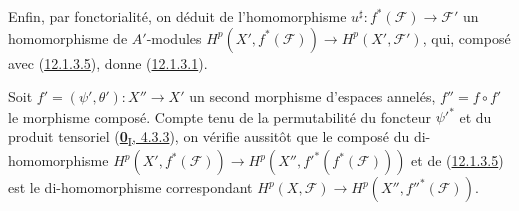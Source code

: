 \begin{env}[12.1.3]
Enfin, par fonctorialité, on déduit de l'homomorphisme
$u^\sharp:f^*(\mathcal F)\to\mathcal F'$ un homomorphisme de $A'$-modules
$H^p(X',f^*(\mathcal F))\to H^p(X',\mathcal F')$, qui, composé avec
(\hyperref[0.12.1.3.5-fr]{12.1.3.5}), donne
(\hyperref[0.12.1.3.1-fr]{12.1.3.1}).

Soit $f'=(\psi',\theta'):X''\to X'$ un second morphisme d'espaces annelés,
$f''=f\circ f'$ le morphisme composé. Compte tenu de la permutabilité du foncteur
$\psi'^*$ et du produit tensoriel
(\hyperref[0.4.3.3-fr]{\textbf{0}\textsubscript{I}, 4.3.3}), on vérifie aussitôt que le
composé du di-homomorphisme
$H^p(X',f^*(\mathcal F))\to H^p(X'',f'^*(f^*(\mathcal F)))$ et de
(\hyperref[0.12.1.3.5-fr]{12.1.3.5}) est le di-homomorphisme correspondant
$H^p(X,\mathcal F)\to H^p(X'',f''^*(\mathcal F))$.
\end{env}

